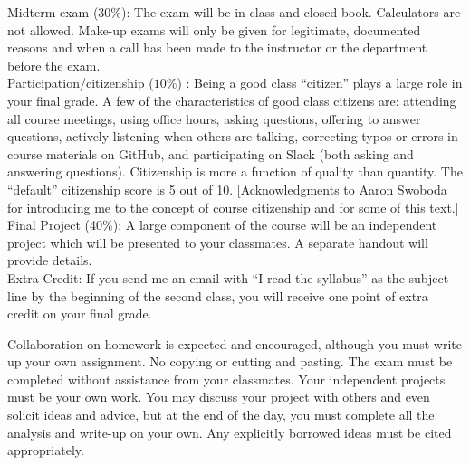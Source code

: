 \documentclass[10pt]{article}
\begin{document}
\noindent Midterm exam (30\%): The exam will be in-class and closed book. Calculators are not allowed. Make-up exams will only be given for legitimate, documented reasons and when a call has been made to the instructor or the department before the exam. \\

\noindent Participation/citizenship ($10\%$) :
Being a good class ``citizen'' plays a large role in your final grade. A few of the characteristics of good class citizens are: attending all course meetings, using office hours, asking questions, offering to answer questions, actively listening when others are talking, correcting typos or errors in course materials on GitHub, and participating on Slack (both asking and answering questions). Citizenship is more a function of quality than quantity. The ``default'' citizenship score is 5 out of 10. [Acknowledgments to Aaron Swoboda for introducing me to the concept of course citizenship and for some of this text.] \\


\noindent Final Project (40\%): A large component of the course will be an independent project which will be presented to your classmates. A separate handout will provide details. \\


\noindent Extra Credit: If you send me an email with ``I read the syllabus'' as the subject line by the beginning of the second class, you will receive one point of extra credit on your final grade. 

\bigskip
{}

Collaboration on homework is expected and encouraged, although you must write up your own assignment. No copying or cutting and pasting. The exam must be completed without assistance from your classmates. Your independent projects must be your own work. You may discuss your project with others and even solicit ideas and advice, but at the end of the day, you must complete all the analysis and write-up on your own. Any explicitly borrowed ideas must be cited appropriately.
\end{document}

